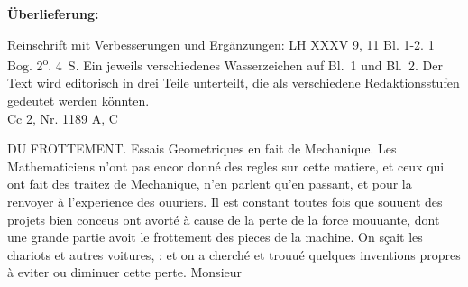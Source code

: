 \begin{ledgroupsized}[r]{120mm}
\footnotesize
\pstart
\noindent\textbf{\"{U}berlieferung:}
\pend
\end{ledgroupsized}
%
\begin{ledgroupsized}[r]{114mm}
\footnotesize
\pstart
\parindent -6mm
Reinschrift mit Verbesserungen und Ergänzungen:
LH XXXV 9, 11 Bl. 1-2.
1 Bog. 2\textsuperscript{o}.
4~S.
Ein jeweils verschiedenes Wasserzeichen auf Bl.~1 und Bl.~2.
Der Text wird editorisch in drei Teile unterteilt,
die als verschiedene Redaktionsstufen gedeutet werden k\"{o}nnten.%
 \\Cc 2, Nr. 1189 A, C
\pend
\end{ledgroupsized}
\vspace*{8mm}
\pstart
\noindent
[1~r\textsuperscript{o}] \hspace{41mm}
DU FROTTEMENT.
\pend
\pstart
\centering Essais Geometriques en fait de Mechanique.
\pend \vspace{1em}
\pstart
{}
\pend
\count{}
\pstart
\noindent
Les Mathematiciens n'ont pas encor donn\'{e} des regles sur cette matiere, et ceux qui ont fait des traitez de
Mechanique, n'en parlent qu'en passant, et pour la renvoyer \`{a} l'experience des ouuriers. Il est constant
toutes fois que souuent des projets bien conceus ont avort\'{e} \`{a} cause de la perte de la force mouuante,
dont une grande partie avoit
le frottement\protect{} des pieces de la machine. On s\c{c}ait 
les chariots et autres voitures,
:
et on a cherch\'{e} et trouu\'{e}
quelques inventions propres \`{a} eviter ou diminuer cette perte.
Monsieur 

